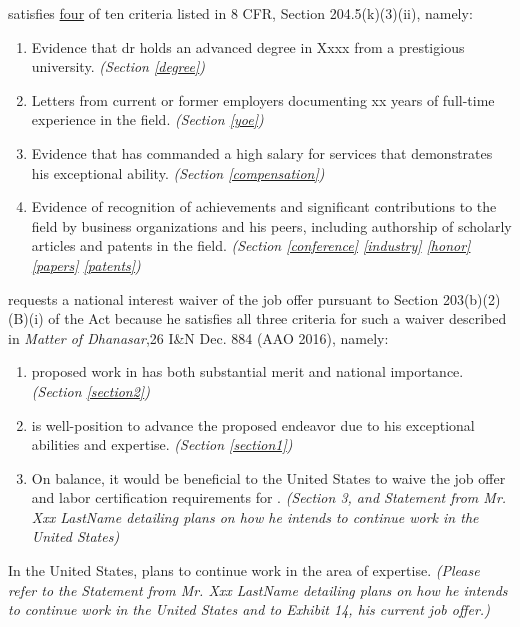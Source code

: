 \documentclass[11pt]{article}
\begin{document}
\dr satisfies \underline{four} of ten criteria listed in 8
CFR, Section 204.5(k)(3)(ii), namely:
\begin{enumerate}
    \item Evidence that dr holds an advanced degree in Xxxx from a prestigious university. \textit{(Section \ref{degree})}

    \item Letters from current or former employers documenting \drs xx years of full-time experience in the \fie{} field. \textit{(Section \ref{yoe})}

    \item Evidence that \dr has commanded a high salary for services that demonstrates his exceptional ability. \textit{(Section \ref{compensation})}
    
    \item Evidence of recognition of \drs achievements and significant contributions to the field by business organizations and his peers, including authorship of scholarly articles and patents in the field. \textit{(Section \ref{conference} \ref{industry} \ref{honor} \ref{papers} \ref{patents})}
\end{enumerate}

\dr requests a national interest waiver of the job offer pursuant to Section 203(b)(2)(B)(i) of the Act because he satisfies all three criteria for such a waiver described in \textit{Matter of Dhanasar},26 I\&N Dec. 884 (AAO 2016), namely:

\begin{enumerate}
\item \drs proposed work in \fie{} has both substantial merit and national importance. \textit{(Section \ref{section2})}

\item \dr is well-position to advance the proposed endeavor due to his exceptional abilities and expertise. \textit{(Section \ref{section1})}

\item On balance, it would be beneficial to the United States to waive the job offer and labor certification requirements for \dr. \textit{(Section 3, and Statement from Mr. Xxx LastName detailing plans on how he intends to continue work in the United States)}

\end{enumerate}

In the United States, \dr plans to continue work in the area of expertise. \textit{(Please refer to the Statement from Mr. Xxx LastName detailing plans on how he intends to continue work in the United States and to Exhibit 14, his current job offer.)} \\
\end{document}
